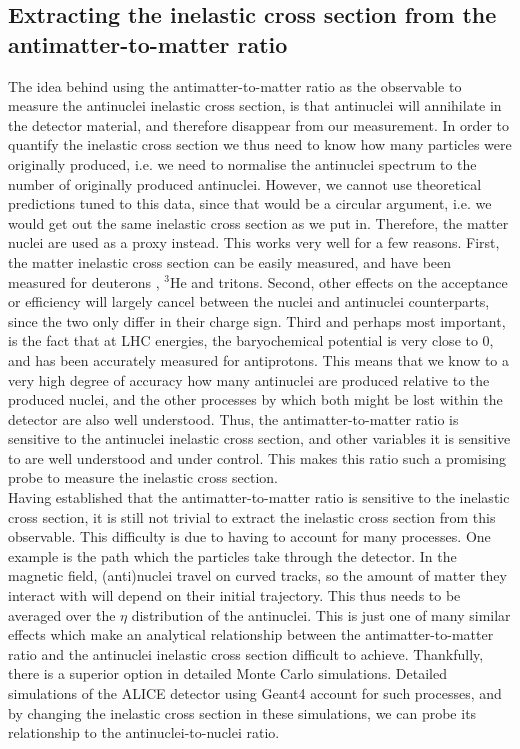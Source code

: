 \subsection{Extracting the inelastic cross section from the antimatter-to-matter ratio}
The idea behind using the antimatter-to-matter ratio as the observable to measure the antinuclei inelastic cross section, is that antinuclei will annihilate in the detector material, and therefore disappear from our measurement. In order to quantify the inelastic cross section we thus need to know how many particles were originally produced, i.e. we need to normalise the antinuclei spectrum to the number of originally produced antinuclei. However, we cannot use theoretical predictions tuned to this data, since that would be a circular argument, i.e. we would get out the same inelastic cross section as we put in. Therefore, the matter nuclei are used as a proxy instead. This works very well for a few reasons. First, the matter inelastic cross section can be easily measured, and have been measured for deuterons \cite{}, $^3\mathrm{He}$\cite{} and tritons\cite{}. Second, other effects on the  acceptance or efficiency will largely cancel between the nuclei and antinuclei counterparts, since the two only differ in their charge sign. Third and perhaps most important, is the fact that at LHC energies, the baryochemical potential is very close to 0, and has been accurately measured for antiprotons. This means that we know to a very high degree of accuracy how many antinuclei are produced relative to the produced nuclei, and the other processes by which both might be lost within the detector are also well understood. Thus, the antimatter-to-matter ratio is sensitive to the antinuclei inelastic cross section, and other variables it is sensitive to are well understood and under control. This makes this ratio such a promising probe to measure the inelastic cross section.\\

Having established that the antimatter-to-matter ratio is sensitive to the inelastic cross section, it is still not trivial to extract the inelastic cross section from this observable. This difficulty is due to having to account for many processes. One example is the path which the particles take through the detector. In the magnetic field, (anti)nuclei travel on curved tracks, so the amount of matter they interact with will depend on their initial trajectory. This thus needs to be averaged over the $\eta$ distribution of the antinuclei. This is just one of many similar effects which make an analytical relationship between the antimatter-to-matter ratio and the antinuclei inelastic cross section difficult to achieve. Thankfully, there is a superior option in detailed Monte Carlo simulations. Detailed simulations of the ALICE detector using Geant4 account for such processes, and by changing the inelastic cross section in these simulations, we can probe its relationship to the antinuclei-to-nuclei ratio.
